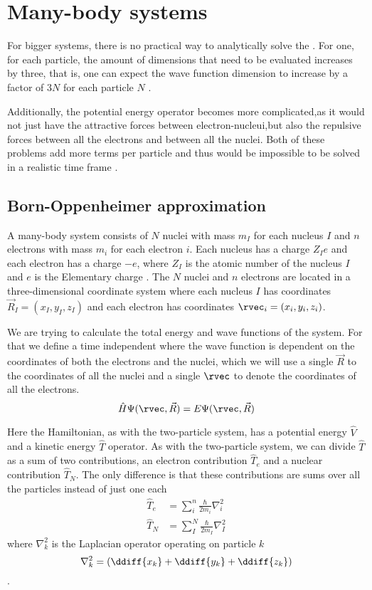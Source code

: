 \documentclass[../master_thesis.tex]{subfiles}
\begin{document}
\section{Many-body systems}

For bigger systems, there is no practical way to analytically solve the
\SE \cite{Jensen:2017}. For one, for each particle, the amount of dimensions that need to be
evaluated increases by three, that is, one can expect the wave function
dimension to increase by a factor of $3N$ for each particle $N$
\cite{Cramer:2004}.

Additionally, the potential energy operator becomes more complicated,as it
would not just have the attractive forces between electron-nucleui,but also the
repulsive forces between all the electrons and between all the nuclei. Both of
these problems add more terms per particle and thus would be impossible to be
solved in a realistic time frame \cite{Jensen:2017}.

\subsection{Born-Oppenheimer approximation} \label{BO}
A many-body system consists of $N$ nuclei with mass $m_I$ for each nucleus $I$
and $n$ electrons with mass $m_i$ for each electron $i$. Each nucleus has a
charge $Z_Ie$ and each electron has a charge $-e$, where $Z_I$ is the atomic
number of the nucleus $I$  and $e$ is the Elementary charge \cite{Atkins:2014}. The $N$ nuclei and $n$
electrons are located in a three-dimensional coordinate system where each nucleus $I$ has
coordinates $\vec{R}_I = (x_I, y_I, z_I)$ and each electron has coordinates
$\rvec_i = (x_i, y_i, z_i)$.

We are trying to calculate the total energy and wave functions of the system. For
that we define a time independent \SE where the wave function is dependent on
the coordinates of both the electrons and the nuclei, which we will use a single $\vec{R}$
to the coordinates of all the nuclei and a single $\rvec$ to denote the coordinates
of all the electrons.
\begin{equation}\label{eq:totalheliumSE}
  \hat{H}\Psi(\rvec, \vec{R}) = E \Psi(\rvec, \vec{R})
\end{equation}

Here the Hamiltonian, as with the two-particle system, has a potential energy $\hat{V}$ and a
kinetic energy $\hat{T}$ operator. As with the two-particle system, we can divide $\hat{T}$ as
a sum of two contributions, an electron contribution $\hat{T}_e$ and a nuclear contribution
$\hat{T}_N$. The only difference is that these contributions are sums over all
the particles instead of just one each\cite{Cramer:2004}
\begin{align}
  \hat{T}_e &= \sum_i^n \frac{\hbar}{2m_i}\nabla^2_i\\
  \hat{T}_N &= \sum_I^N \frac{\hbar}{2m_I}\nabla^2_I
\end{align}
where $\nabla^2_k$ is the Laplacian operator operating on particle $k$
\begin{equation}
  \nabla^2_k = \left( \ddiff{x_k} + \ddiff{y_k} + \ddiff{z_k} \right)
\end{equation}.
\end{document}
